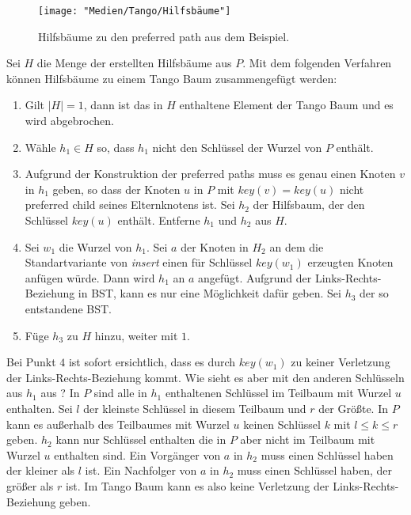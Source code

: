 \documentclass[a4paper,12pt]{article}
\begin{document}
\begin{figure}[H]
	\centering
	\texttt{[image: "Medien/Tango/Hilfsbäume"]}
	\caption{Hilfsbäume zu den preferred path aus dem Beispiel. }
	\label{fig:Hilfsbäume}
\end{figure}
Sei $H$ die Menge der erstellten Hilfsbäume aus $P$. Mit dem folgenden Verfahren können Hilfsbäume zu einem Tango Baum zusammengefügt werden:
\begin{enumerate}
	\item Gilt $\vert H \vert = 1$, dann ist das in $H$ enthaltene Element der Tango Baum und es wird abgebrochen.
	\item Wähle $h_1 \in H$ so, dass $h_1$ nicht den Schlüssel der Wurzel von $P$ enthält.
	\item Aufgrund der Konstruktion der preferred paths muss es genau einen Knoten $v$ in $h_1$ geben, so dass der Knoten $u$ in $P$ mit $\mathit{key}\left(v\right) = \mathit{key}\left(u\right) $ nicht preferred child seines Elternknotens ist.
	Sei $h_2$ der Hilfsbaum, der den Schlüssel $\mathit{key}\left(u\right)$ enthält. Entferne $h_1$ und $h_2$ aus $H$.
	\item Sei $w_1$ die Wurzel von $h_1$. Sei $a$ der Knoten in $H_2$ an dem die Standartvariante von \textit{insert} einen für Schlüssel  $\mathit{key\left(w_1\right)}$ erzeugten Knoten anfügen würde. Dann wird $h_1$ an $a$ angefügt. Aufgrund der Links-Rechts-Beziehung in BST, kann es nur eine Möglichkeit dafür geben. Sei $h_3$ der so entstandene BST.
	\item Füge $h_3$ zu $H$ hinzu, weiter mit $1$.
\end{enumerate}

\noindent Bei Punkt $4$ ist sofort ersichtlich, dass es durch $\mathit{key}\left(w_1\right)$ zu keiner Verletzung der Links-Rechts-Beziehung kommt. Wie sieht es aber mit den anderen Schlüsseln aus $h_1$ aus ? 
In $P$ sind alle in $h_1$ enthaltenen Schlüssel im Teilbaum mit Wurzel $u$ enthalten. Sei $l$ der kleinste Schlüssel in diesem Teilbaum und $r$ der Größte. In $P$ kann es außerhalb des Teilbaumes mit Wurzel $u$ keinen Schlüssel $k$ mit $l \leq k \leq r$ geben. $h_2$ kann nur Schlüssel enthalten die in $P$ aber nicht im Teilbaum mit Wurzel $u$ enthalten sind. Ein Vorgänger von $a$ in $h_2$ muss einen Schlüssel haben der kleiner als $l$ ist. Ein Nachfolger von $a$ in $h_2$ muss einen Schlüssel haben, der größer als $r$ ist. Im Tango Baum kann es also keine Verletzung der Links-Rechts-Beziehung geben.\\
\end{document}
